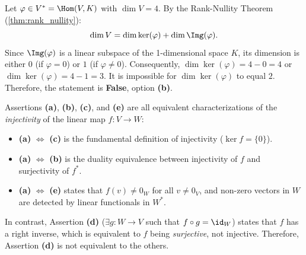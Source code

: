 \begin{exercisesolution*}
\label{sol:dim_kernel_linear_functional_sc}
Let $\varphi \in V^* = \Hom(V, K)$ with $\dim V = 4$.
By the Rank-Nullity Theorem (\cref{thm:rank_nullity}):
\[
\dim V = \dim \ker(\varphi) + \dim \Img(\varphi).
\]
Since $\Img(\varphi)$ is a linear subspace of the 1-dimensional space $K$, its dimension is either $0$ (if $\varphi = 0$) or $1$ (if $\varphi \ne 0$).
Consequently, $\dim \ker(\varphi) = 4 - 0 = 4$ or $\dim \ker(\varphi) = 4 - 1 = 3$.
It is impossible for $\dim \ker(\varphi)$ to equal $2$.
Therefore, the statement is \textbf{False}, option \textbf{(b)}.
\end{exercisesolution*}

\begin{exercisesolution*}
\label{sol:dual_map_equivalences_sc}
Assertions \textbf{(a)}, \textbf{(b)}, \textbf{(c)}, and \textbf{(e)} are all equivalent characterizations of the \emph{injectivity} of the linear map $f \colon V \to W$:
\begin{itemize}
    \item \textbf{(a)} $\iff$ \textbf{(c)} is the fundamental definition of injectivity ($\ker f = \{0\}$).
    \item \textbf{(a)} $\iff$ \textbf{(b)} is the duality equivalence between injectivity of $f$ and surjectivity of $f^*$.
    \item \textbf{(a)} $\iff$ \textbf{(e)} states that $f(v) \ne 0_W$ for all $v \ne 0_V$, and non-zero vectors in $W$ are detected by linear functionals in $W^*$.
\end{itemize}
In contrast, Assertion \textbf{(d)} ($\exists g \colon W \to V$ such that $f \circ g = \id_W$) states that $f$ has a right inverse, which is equivalent to $f$ being \emph{surjective}, not injective.
Therefore, Assertion \textbf{(d)} is not equivalent to the others.
\end{exercisesolution*}

